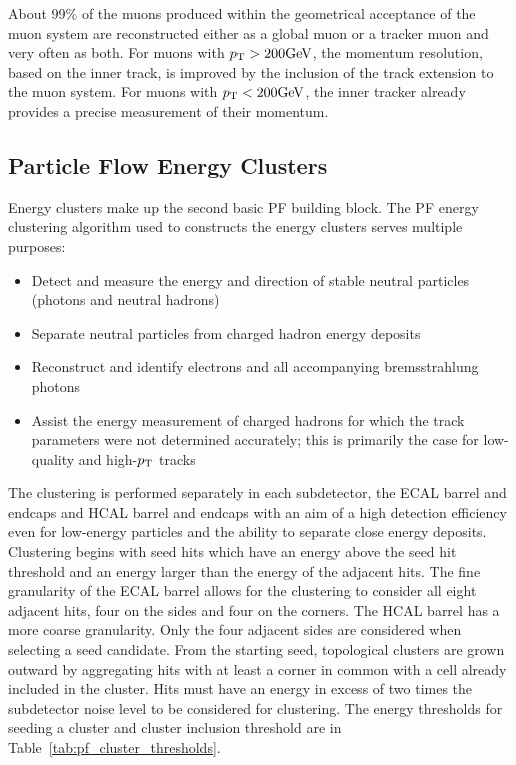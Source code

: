 About 99\% of the muons produced within the geometrical acceptance of the muon system are 
reconstructed either as a global muon or a tracker muon and very often as both.
For muons with $p_\mathrm{T} > 200\mathrm{GeV}$, the momentum resolution, based on the inner track, is 
improved by the inclusion of the track extension to the muon system.
For muons with $p_\mathrm{T} < 200\mathrm{GeV}$, the inner tracker already provides a precise measurement of 
their momentum.


\subsection{Particle Flow Energy Clusters}
Energy clusters make up the second basic PF building block. The PF energy
clustering algorithm used to constructs the energy clusters serves multiple purposes:
\begin{itemize}
\item Detect and measure the energy and direction of stable neutral particles (photons and neutral hadrons)
\item Separate neutral particles from charged hadron energy deposits
\item Reconstruct and identify electrons and all accompanying bremsstrahlung photons
\item Assist the energy measurement of charged hadrons for which the track parameters were not 
determined accurately; this is primarily the case for low-quality and high-$p_\mathrm{T}$ tracks
\end{itemize}
The clustering is performed separately in each subdetector, the ECAL barrel and endcaps and HCAL barrel
and endcaps with an aim of a high detection efficiency even for low-energy particles and the ability to 
separate close energy deposits. Clustering begins with seed hits which have an energy above the seed hit
threshold and an energy larger than the energy of the adjacent hits. The fine granularity of the 
ECAL barrel allows
for the clustering to consider all eight adjacent hits, four on the sides and four on the corners.
The HCAL barrel has a more coarse granularity. Only the four adjacent sides are considered when
selecting a seed candidate. From the starting seed, topological clusters are grown outward by aggregating
hits with at least a corner in common with a cell already included in the cluster. Hits must have an energy
in excess of two times the subdetector noise level to be considered for clustering. The energy thresholds
for seeding a cluster and cluster inclusion threshold are in Table~\ref{tab:pf_cluster_thresholds}.


